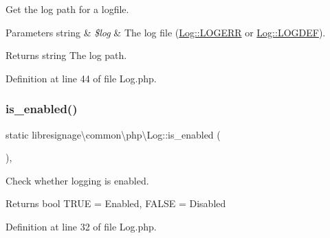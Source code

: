 Get the log path for a logfile.


\begin{DoxyParams}[1]{Parameters}
string & {\em \$log} & The log file (\hyperlink{classlibresignage_1_1common_1_1php_1_1Log_a336070aa9fcd03e90939473671a88525}{Log\+::\+L\+O\+G\+E\+RR} or \hyperlink{classlibresignage_1_1common_1_1php_1_1Log_af7e8bd6a685a8bab717735b92ba5e6a6}{Log\+::\+L\+O\+G\+D\+EF}).\\
\hline
\end{DoxyParams}
\begin{DoxyReturn}{Returns}
string The log path. 
\end{DoxyReturn}


Definition at line 44 of file Log.\+php.

\mbox{\label{classlibresignage_1_1common_1_1php_1_1Log_ab8b7a79f1be86c64179d8955818c07a1}} 
\subsubsection{\texorpdfstring{is\+\_\+enabled()}{is\_enabled()}}
{\footnotesize\ttfamily static libresignage\textbackslash{}common\textbackslash{}php\textbackslash{}\+Log\+::is\+\_\+enabled (\begin{DoxyParamCaption}{ }\end{DoxyParamCaption})\hspace{0.3cm}{\ttfamily [static]}, {\ttfamily [private]}}

Check whether logging is enabled.

\begin{DoxyReturn}{Returns}
bool T\+R\+UE = Enabled, F\+A\+L\+SE = Disabled 
\end{DoxyReturn}


Definition at line 32 of file Log.\+php.

\mbox{\label{classlibresignage_1_1common_1_1php_1_1Log_a8ff310f96d1553211e564f3f07cc3fa2}} 
